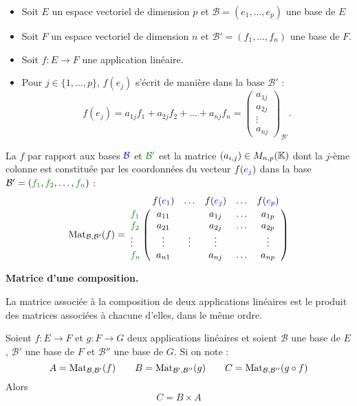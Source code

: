 \documentclass[10pt,class=article,crop=false]{standalone}
\begin{document}
\begin{multicols}{2}
\begin{itemize}
	\item Soit $E$ un espace vectoriel de dimension $p$ et $\mathcal{B}=(e_1, \dots ,e_p)$ une base de $E$
	\item Soit $F$ un espace vectoriel de dimension $n$ et $\mathcal{B}'=(f_1, \dots ,f_n)$ une base de $F$.
	\item Soit $f : E \to F$ une application linéaire.
	\item Pour $j \in \{1,\ldots,p\}$, $f(e_j)$
	s'écrit de manière dans la base $\mathcal{B}'$ :
	$$f (e_j)=a_{1j}f_1+a_{2j}f_2+\dots +a_{nj}f_n = \left(\begin{smallmatrix}a_{1j}\\a_{2j}\\ \vdots \\a_{nj}\end{smallmatrix}\right)_{\!\!\mathcal{B}'}.$$
\end{itemize}

La  $f$ par
rapport aux bases ${\color{blue}\mathcal{B}}$ et ${\color{Green4}\mathcal{B}'}$ est la matrice $(a_{i,j}) \in M_{n,p}(\mathbb{K})$
dont la $j$-ème colonne est constituée par les coordonnées du vecteur
$f({\color{blue}e_j})$ dans la base
$\mathcal{B}'=({\color{Green4}f_1}, {\color{Green4}f_2}, \ldots ,{\color{Green4}f_n})$ :
$$\Mat_{\mathcal{B},\mathcal{B}'}(f) = \bordermatrix{    & f({\color{blue}e_1})& \ldots & f({\color{blue}e_j})  &\ldots  & f({\color{blue}e_p})\cr
{\color{Green4}f_1} & a_{11} &        & a_{1j} & \ldots & a_{1p}\cr
{\color{Green4}f_2} & a_{21} &        & a_{2j} & \ldots & a_{2p}\cr
\vdots & \vdots & \vdots & \vdots &        & \vdots\cr
{\color{Green4}f_n} & a_{n1} &        & a_{nj} & \ldots & a_{np}}$$





\textbf{Matrice d'une composition.}

La matrice
associée à la composition de deux applications linéaires est le
produit des matrices associées à chacune d'elles, dans le même ordre.


\begin{proposition}
	\label{prop:multmatlin}
	Soient $f : E \to F$  et $g : F \to G$ deux applications linéaires et soient
	$\mathcal{B}$ une base de $E$, $\mathcal{B}'$ une base de $F$
	et $\mathcal{B}''$ une base de $G$.
	Si on note :
	$$A = \operatorname{Mat}_{\mathcal{B},\mathcal{B}'} (f)
	\qquad
	B = \operatorname{Mat}_{\mathcal{B}',\mathcal{B}''} (g)
	\qquad
	C = \operatorname{Mat}_{\mathcal{B},\mathcal{B}''} (g \circ f)$$
	Alors
	$$C = B\times A$$
\end{proposition}




\end{multicols}
\end{document}
